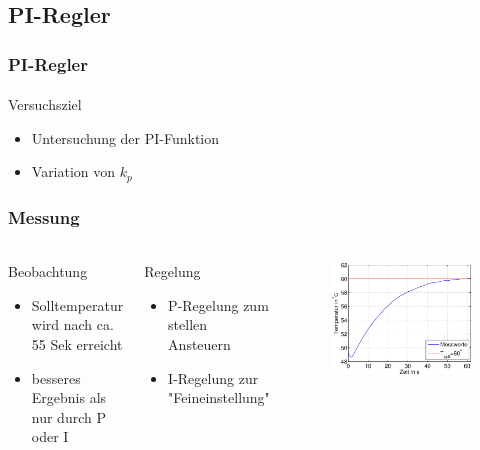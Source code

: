 \subsection{PI-Regler} %
\label{sub:PI-Regler}
\begin{frame}
    \frametitle{PI-Regler}
    \framesubtitle{}
    \begin{block}{Versuchsziel}
         \begin{itemize}
             \item Untersuchung der PI-Funktion
             \item Variation von $k_p$
         \end{itemize}
    \end{block}
\end{frame}
\begin{frame}
    \frametitle{Messung}
    \framesubtitle{}
    \begin{columns}[c]
        \begin{block}{Beobachtung}
            \begin{itemize}
                \item Solltemperatur wird nach ca. 55 Sek erreicht
                \item besseres Ergebnis als nur durch P oder I
            \end{itemize}    
        \end{block}
        \begin{block}{Regelung}
            \begin{itemize}
                \item P-Regelung zum stellen Ansteuern
                \item I-Regelung zur "Feineinstellung"
            \end{itemize}
        \end{block}
        \begin{figure}[H]
        \begin{center}
                \includegraphics[scale=0.3]{./img/plots/2d_kb_0_1_t_200.eps}

\end{center}
\end{figure}
\end{columns}
\end{frame}
